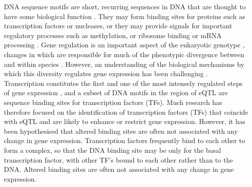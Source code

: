 \documentclass[12pt, onecolumn, oneside]{gsajnl}
\begin{document}
DNA sequence motifs are short, recurring sequences in DNA that are thought to have some biological function \citep{d2006dna}. They may form binding sites for proteins such as transcription factors or nucleases, or they may provide signals for important regulatory processes such as methylation, or ribosome binding or mRNA processing \citep{d2006dna}. Gene regulation is an important aspect of the eukaryotic genotype \citep{beckerman2005gene}, changes in which are responsible for much of the phenotypic divergence between and within species \citep{stewart2012transcription}. However, an understanding of the biological mechanisms by which this diversity regulates gene expression has been challenging  \citep{pai2015genetic, gaffney2013global}. Transcription constitutes the first and one of the most intensely regulated steps of gene expression \citep{zabidi2016regulatory}, and a subset of DNA motifs in the region of eQTL are sequence binding sites for transcription factors (TFs). Much research has therefore focused on the identification of transcription factors (TFs) that coincide with eQTL and are likely to enhance or restrict gene expression. However, it has
been hypothesised that altered binding sites are often not associated with any change in gene expression.  Transcription factors frequently bind to each other to form a complex, so that the DNA binding site may be only for the basal transcription factor, with other TF's bound to each other rather than to the DNA. Altered binding sites are often not associated with any change in gene expression.
\end{document}
